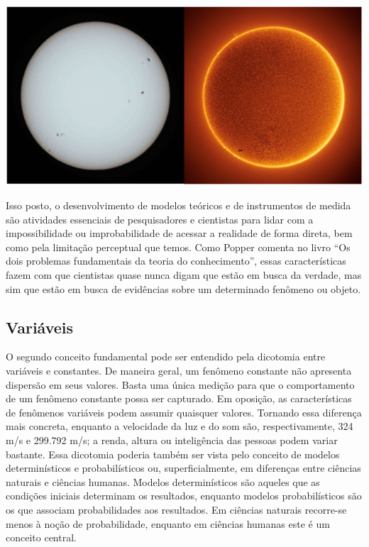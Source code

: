 \documentclass[
]{book}
\begin{document}
\includegraphics{./img/cap_sol.png}

Isso posto, o desenvolvimento de modelos teóricos e de instrumentos de medida são atividades essenciais de pesquisadores e cientistas para lidar com a impossibilidade ou improbabilidade de acessar a realidade de forma direta, bem como pela limitação perceptual que temos. Como Popper \citep{Popper2009-POPTTF} comenta no livro ``Os dois problemas fundamentais da teoria do conhecimento'', essas características fazem com que cientistas quase nunca digam que estão em busca da verdade, mas sim que estão em busca de evidências sobre um determinado fenômeno ou objeto.

\hypertarget{variuxe1veis}{%
\subsection{Variáveis}\label{variuxe1veis}}

O segundo conceito fundamental pode ser entendido pela dicotomia entre variáveis e constantes. De maneira geral, um fenômeno constante não apresenta dispersão em seus valores. Basta uma única medição para que o comportamento de um fenômeno constante possa ser capturado. Em oposição, as características de fenômenos variáveis podem assumir quaisquer valores. Tornando essa diferença mais concreta, enquanto a velocidade da luz e do som são, respectivamente, 324 m/s e 299.792 m/s; a renda, altura ou inteligência das pessoas podem variar bastante. Essa dicotomia poderia também ser vista pelo conceito de modelos determinísticos e probabilísticos ou, superficialmente, em diferenças entre ciências naturais e ciências humanas. Modelos determinísticos são aqueles que as condições iniciais determinam os resultados, enquanto modelos probabilísticos são os que associam probabilidades aos resultados. Em ciências naturais recorre-se menos à noção de probabilidade, enquanto em ciências humanas este é um conceito central.
\end{document}
